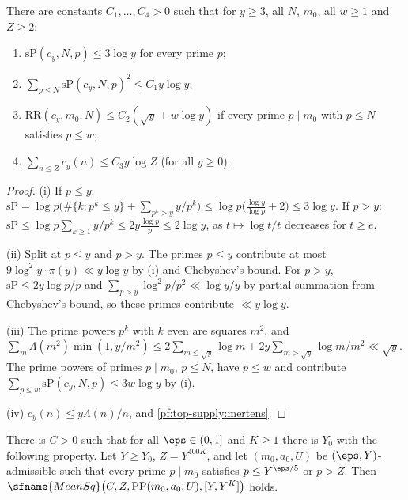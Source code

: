 \begin{lemma}\label{pf:top-supply:diag}
There are constants $C_1,\dots,C_4>0$ such that for $y\ge3$, all $N$, $m_0$, all $w\ge1$ and $Z\ge2$:
\begin{enumerate}[label=(\roman*)]
\item $\mathrm{sP}(c_y,N,p)\le3\log y$ for every prime $p$;
\item $\sum_{p\le N}\mathrm{sP}(c_y,N,p)^2\le C_1y\log y$;
\item $\mathrm{RR}(c_y,m_0,N)\le C_2(\sqrt y+w\log y)$ if every prime $p\mid m_0$ with $p\le N$ satisfies $p\le w$;
\item $\sum_{n\le Z}c_y(n)\le C_3y\log Z$ (for all $y\ge0$).
\end{enumerate}
  
\end{lemma}

\begin{proof}
(i) If $p\le y$: $\mathrm{sP}=\log p\big(\#\{k:p^k\le y\}+\sum_{p^k>y}y/p^k\big)\le\log p\big(\frac{\log y}{\log p}+2\big)\le3\log y$.
If $p>y$: $\mathrm{sP}\le\log p\sum_{k\ge1}y/p^k\le2y\frac{\log p}p\le2\log y$, as $t\mapsto\log t/t$ decreases for $t\ge e$.

(ii) Split at $p\le y$ and $p>y$. The primes $p\le y$ contribute at most $9\log^2y\cdot\pi(y)\ll y\log y$ by (i) and
Chebyshev's bound. For $p>y$, $\mathrm{sP}\le2y\log p/p$ and $\sum_{p>y}\log^2p/p^2\ll\log y/y$ by partial summation from
Chebyshev's bound, so these primes contribute $\ll y\log y$.

(iii) The prime powers $p^k$ with $k$ even are squares $m^2$, and $\sum_m\Lambda(m^2)\min(1,y/m^2)\le2\sum_{m\le\sqrt
y}\log m+2y\sum_{m>\sqrt y}\log m/m^2\ll\sqrt y$. The prime powers of primes $p\mid m_0$, $p\le N$, have $p\le w$ and
contribute $\sum_{p\le w}\mathrm{sP}(c_y,N,p)\le3w\log y$ by (i).

(iv) $c_y(n)\le y\Lambda(n)/n$, and \cref{pf:top-supply:mertens}.
\end{proof}

\begin{proposition}\label{pf:top-supply:meanSqK}
There is $C>0$ such that for all $\eps\in(0,1]$ and $K\ge1$ there is $Y_0$ with the following property. Let $Y\ge Y_0$,
$Z=Y^{400K}$, and let $(m_0,a_0,U)$ be $(\eps,Y)$-admissible such that every prime $p\mid m_0$ satisfies $p\le
Y^{\eps/5}$ or $p>Z$. Then $\sfname{MeanSq}\big(C,Z,\topsupplyPP(m_0,a_0,U),[Y,Y^K]\big)$ holds.
\end{proposition}

